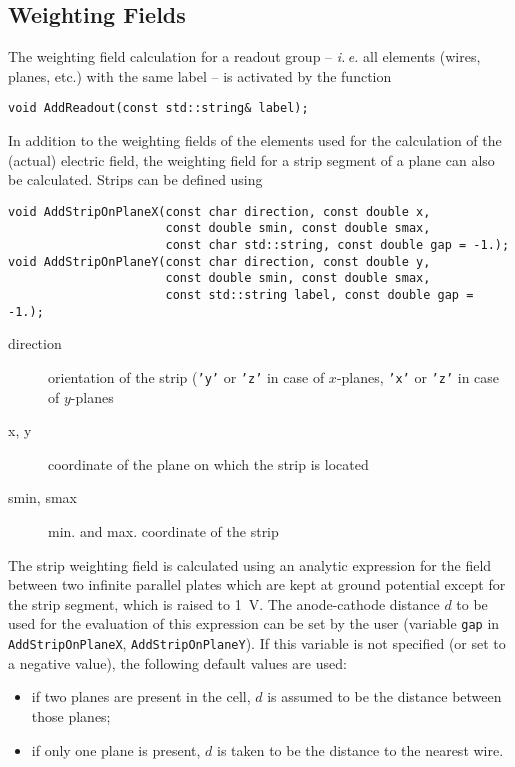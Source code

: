 \subsection{Weighting Fields}

The weighting field calculation for a readout group 
-- \textit{i.\,e.} all elements (wires, planes, etc.) with the same label --
is activated by the function
\begin{lstlisting}
void AddReadout(const std::string& label);
\end{lstlisting}
In addition to the weighting fields of 
the elements used for the calculation of the 
(actual) electric field, 
the weighting field for a strip segment of a plane 
can also be calculated. 
Strips can be defined using
\begin{lstlisting}
void AddStripOnPlaneX(const char direction, const double x,
                      const double smin, const double smax,
                      const char std::string, const double gap = -1.);
void AddStripOnPlaneY(const char direction, const double y,
                      const double smin, const double smax,
                      const std::string label, const double gap = -1.);
\end{lstlisting} 
\begin{description}
  \item[direction]
  orientation of the strip (\texttt{'y'} or \texttt{'z'} 
  in case of \(x\)-planes, \texttt{'x'} or \texttt{'z'} 
  in case of \(y\)-planes
  \item[x, y] coordinate of the plane on which the strip is located
  \item[smin, smax] min. and max. coordinate of the strip
\end{description}
The strip weighting field is calculated using an analytic expression for  
the field between two infinite parallel plates which are kept at 
ground potential except for the strip segment, which is raised to 1~V.
The anode-cathode distance \(d\) to be used for the evaluation of this 
expression can be set by the user (variable \texttt{gap} in 
\texttt{AddStripOnPlaneX}, \texttt{AddStripOnPlaneY}). 
If this variable is not specified (or set to a negative value), 
the following default values are used:
\begin{itemize}
  \item
  if two planes are present in the cell, \(d\) is  
  assumed to be the distance between those planes;
  \item
  if only one plane is present, \(d\) is taken to be 
  the distance to the nearest wire.
\end{itemize}

